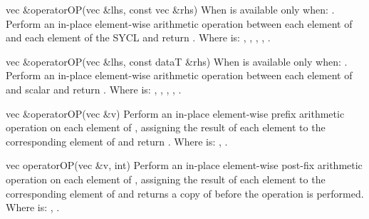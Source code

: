   \addRow
  {vec \&operatorOP(vec \&lhs, const vec \&rhs)}
  {
    When  is \codeinline{\%=} available only when: .
    \newline
    Perform an in-place element-wise  arithmetic operation between each element of   and each element of the  SYCL  and return  .
    \newline \newline
    Where  is: \codeinline{+=}, \codeinline{-=}, \codeinline{*=}, \codeinline{/=}, \codeinline{\%=}.
  }

   \addRow
  {vec \&operatorOP(vec \&lhs, const dataT \&rhs)}
  {
    When  is \codeinline{\%=} available only when: .
    \newline
    Perform an in-place element-wise  arithmetic operation between each element of   and  scalar and return  .
    \newline \newline
    Where  is: \codeinline{+=}, \codeinline{-=}, \codeinline{*=}, \codeinline{/=}, \codeinline{\%=}.
  }

  \addRow
  {vec \&operatorOP(vec \&v)}
  {
    Perform an in-place element-wise  prefix arithmetic operation on each element of  , assigning the result of each element to the corresponding element of   and return  .
    \newline \newline
    Where  is: \codeinline{++}, \codeinline{--}. 
  }

  \addRow
  {vec operatorOP(vec \&v, int)}
  {
    Perform an in-place element-wise  post-fix arithmetic operation on each element of  , assigning the result of each element to the corresponding element of   and returns a copy of   before the operation is performed.
    \newline \newline
    Where  is: \codeinline{++}, \codeinline{--}.
  }
  
